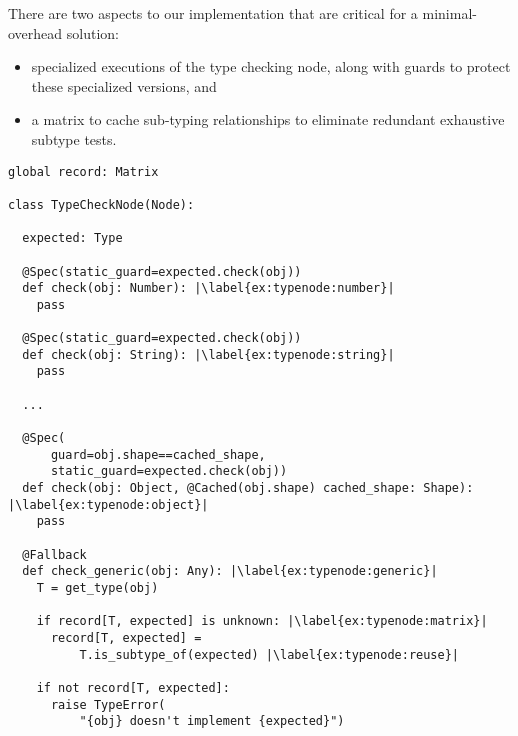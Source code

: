 There are two aspects to our implementation that are critical for a minimal-overhead solution:

\begin{itemize}
  \item specialized executions of the type checking node, along with guards to protect these specialized versions, and
  \item a matrix to cache sub-typing relationships to eliminate
    redundant exhaustive subtype tests.
\end{itemize}
 

\begin{lstlisting}[label={ex:typenode},escapechar=|,caption={An illustration of the type checking node that support type checking},float,floatplacement=htbp,columns=flexible,morekeywords={global}]
global record: Matrix

class TypeCheckNode(Node):

  expected: Type

  @Spec(static_guard=expected.check(obj))
  def check(obj: Number): |\label{ex:typenode:number}|
    pass

  @Spec(static_guard=expected.check(obj))
  def check(obj: String): |\label{ex:typenode:string}|
    pass

  ...

  @Spec(
      guard=obj.shape==cached_shape,
      static_guard=expected.check(obj))
  def check(obj: Object, @Cached(obj.shape) cached_shape: Shape): |\label{ex:typenode:object}|
    pass
  
  @Fallback
  def check_generic(obj: Any): |\label{ex:typenode:generic}|
    T = get_type(obj)
    
    if record[T, expected] is unknown: |\label{ex:typenode:matrix}|
      record[T, expected] =
          T.is_subtype_of(expected) |\label{ex:typenode:reuse}|

    if not record[T, expected]:
      raise TypeError(
          "{obj} doesn't implement {expected}")
\end{lstlisting}

